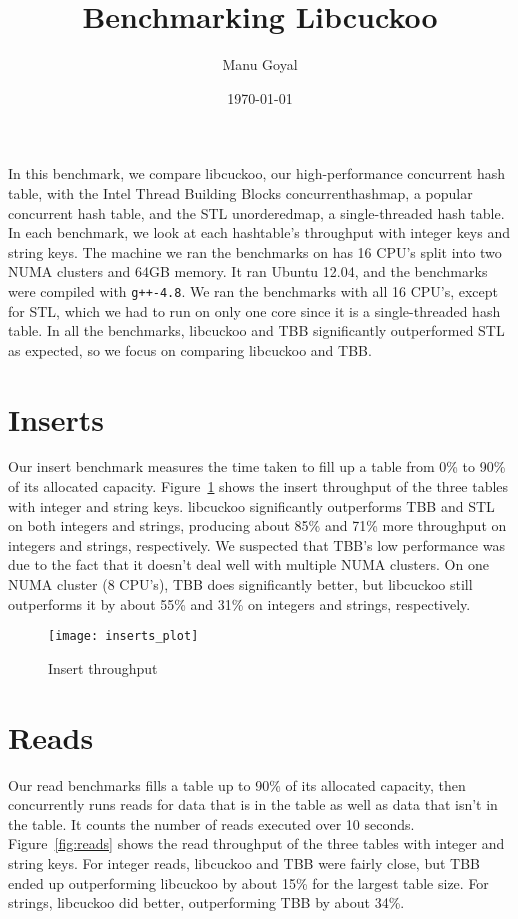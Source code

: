 \documentclass[12pt, letterpaper]{article}
\title{Benchmarking Libcuckoo}
\author{Manu Goyal}
\date{\today}
\newcommand{\myfigwidth}{0.9\textwidth}
\begin{document}
\maketitle

In this benchmark, we compare libcuckoo, our high-performance
concurrent hash table, with the Intel Thread Building Blocks
{concurrent\textunderscore hash\textunderscore map}, a popular
concurrent hash table, and the STL {unordered\textunderscore map}, a
single-threaded hash table. In each benchmark, we look at each
hashtable's throughput with integer keys and string keys. The machine
we ran the benchmarks on has 16 CPU's split into two NUMA clusters and
64GB memory. It ran Ubuntu 12.04, and the benchmarks were compiled
with \texttt{g++-4.8}. We ran the benchmarks with all 16 CPU's, except
for STL, which we had to run on only one core since it is a
single-threaded hash table. In all the benchmarks, libcuckoo and TBB
significantly outperformed STL as expected, so we focus on comparing
libcuckoo and TBB.

\section{Inserts}
\label{sec:inserts}

Our insert benchmark measures the time taken to fill up a table from
0\% to 90\% of its allocated capacity. Figure~\ref{fig:inserts} shows
the insert throughput of the three tables with integer and string
keys. libcuckoo significantly outperforms TBB and STL on both integers
and strings, producing about 85\% and 71\% more throughput on integers
and strings, respectively. We suspected that TBB's low performance was
due to the fact that it doesn't deal well with multiple NUMA clusters.
On one NUMA cluster (8 CPU's), TBB does significantly better, but
libcuckoo still outperforms it by about 55\% and 31\% on integers and
strings, respectively.

\begin{figure}
  \centering
  \texttt{[image: inserts\_plot]}
  \caption{Insert throughput}
  \label{fig:inserts}
\end{figure}

\section{Reads}
\label{sec:reads}

Our read benchmarks fills a table up to 90\% of its allocated
capacity, then concurrently runs reads for data that is in the table
as well as data that isn't in the table. It counts the number of reads
executed over 10 seconds. Figure~\ref{fig:reads} shows the read
throughput of the three tables with integer and string keys. For
integer reads, libcuckoo and TBB were fairly close, but TBB ended up
outperforming libcuckoo by about 15\% for the largest table size. For
strings, libcuckoo did better, outperforming TBB by about 34\%.
\end{document}
